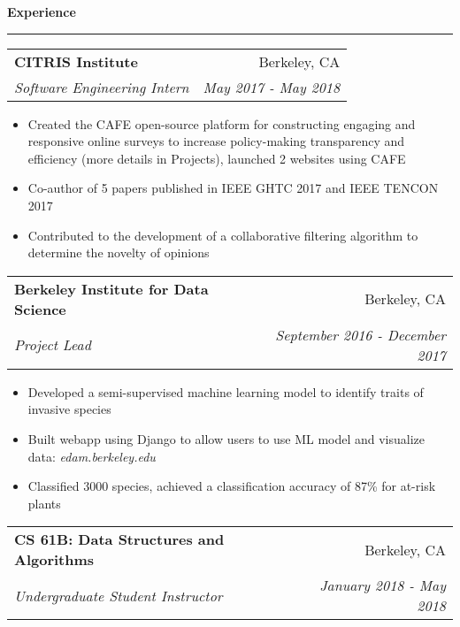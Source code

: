 \documentclass[11pt,letterpaper]{article}
\makeatletter
\newenvironment{topic}[1]
    {
    {\Large \centerline{#1}}
    \vspace*{0.03in}
    \hrule 
    \vspace*{0.05in}
    }
    {}
\newenvironment{event}
    {
    \begin{tabular*}{\textwidth}{l@{\extracolsep{\fill}}r}
    }
    {
    \end{tabular*}
    }
\makeatother
\begin{document}
\begin{topic}{\textbf{Experience}}
        \begin{event}
            \textbf{CITRIS Institute} & Berkeley, CA \\
            \emph{Software Engineering Intern} & \emph{May 2017 - May 2018}
        \end{event}
            \begin{itemize}
                \item Created the CAFE open-source platform for constructing engaging and responsive online surveys to increase policy-making transparency and efficiency (more details in Projects), launched 2 websites using CAFE
                \item Co-author of 5 papers published in IEEE GHTC 2017 and IEEE TENCON 2017
                \item Contributed to the development of a collaborative filtering algorithm to determine the novelty of opinions
            \end{itemize}

        \begin{event}
            \textbf{Berkeley Institute for Data Science} & Berkeley, CA \\
            \emph{Project Lead} & \emph{September 2016 - December 2017} \\
        \end{event}
            \begin{itemize}
                \item Developed a semi-supervised machine learning model to identify traits of invasive species
                \item Built webapp using Django to allow users to use ML model and visualize data: \emph{edam.berkeley.edu}
                \item Classified 3000 species, achieved a classification accuracy of 87\% for at-risk plants
            \end{itemize}

        \begin{event}
            \textbf{CS 61B: Data Structures and Algorithms} & Berkeley, CA \\
            \emph{Undergraduate Student Instructor} & \emph{January 2018 - May 2018}
        \end{event}
        
        
    \end{topic} 
\end{document}
